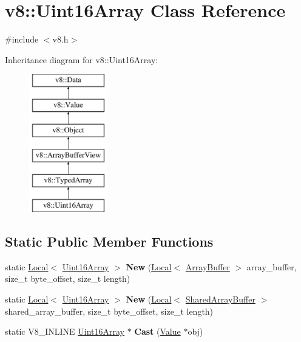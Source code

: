 \hypertarget{classv8_1_1Uint16Array}{}\section{v8\+:\+:Uint16\+Array Class Reference}
\label{classv8_1_1Uint16Array}


{\ttfamily \#include $<$v8.\+h$>$}

Inheritance diagram for v8\+:\+:Uint16\+Array\+:\begin{figure}[H]
\begin{center}
\leavevmode
\includegraphics[height=6.000000cm]{classv8_1_1Uint16Array}
\end{center}
\end{figure}
\subsection*{Static Public Member Functions}
\begin{DoxyCompactItemize}
\item 
static \hyperlink{classv8_1_1Local}{Local}$<$ \hyperlink{classv8_1_1Uint16Array}{Uint16\+Array} $>$ {\bfseries New} (\hyperlink{classv8_1_1Local}{Local}$<$ \hyperlink{classv8_1_1ArrayBuffer}{Array\+Buffer} $>$ array\+\_\+buffer, size\+\_\+t byte\+\_\+offset, size\+\_\+t length)\hypertarget{classv8_1_1Uint16Array_aa0aafae1f5a8ce1267174391c699bd20}{}\label{classv8_1_1Uint16Array_aa0aafae1f5a8ce1267174391c699bd20}

\item 
static \hyperlink{classv8_1_1Local}{Local}$<$ \hyperlink{classv8_1_1Uint16Array}{Uint16\+Array} $>$ {\bfseries New} (\hyperlink{classv8_1_1Local}{Local}$<$ \hyperlink{classv8_1_1SharedArrayBuffer}{Shared\+Array\+Buffer} $>$ shared\+\_\+array\+\_\+buffer, size\+\_\+t byte\+\_\+offset, size\+\_\+t length)\hypertarget{classv8_1_1Uint16Array_a2e3f82cf34b770742b2ca8d7486573e2}{}\label{classv8_1_1Uint16Array_a2e3f82cf34b770742b2ca8d7486573e2}

\item 
static V8\+\_\+\+I\+N\+L\+I\+NE \hyperlink{classv8_1_1Uint16Array}{Uint16\+Array} $\ast$ {\bfseries Cast} (\hyperlink{classv8_1_1Value}{Value} $\ast$obj)\hypertarget{classv8_1_1Uint16Array_a84b017960621903a00ef2d912233ce34}{}\label{classv8_1_1Uint16Array_a84b017960621903a00ef2d912233ce34}

\end{DoxyCompactItemize}

